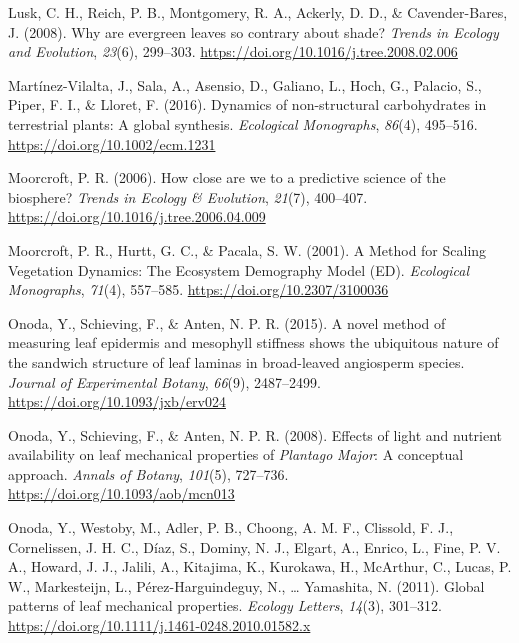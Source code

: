 \documentclass[
  12pt,
  letterpaper,
  DIV=11,
  numbers=noendperiod]{scrartcl}
\newlength{\cslhangindent}
\newlength{\cslentryspacingunit} %
\newenvironment{CSLReferences}[2] %
 {%
  \setlength{\parindent}{0pt}
  \ifodd #1
  \let\oldpar\par
  \def\par{\hangindent=\cslhangindent\oldpar}
  \fi
  \setlength{\parskip}{#2\cslentryspacingunit}
 }%
 {}
\begin{document}
\begin{CSLReferences}{1}{0}
\leavevmode{}%
Lusk, C. H., Reich, P. B., Montgomery, R. A., Ackerly, D. D., \&
Cavender-Bares, J. (2008). Why are evergreen leaves so contrary about
shade? \emph{Trends in Ecology and Evolution}, \emph{23}(6), 299--303.
\url{https://doi.org/10.1016/j.tree.2008.02.006}

\leavevmode{}%
Martínez-Vilalta, J., Sala, A., Asensio, D., Galiano, L., Hoch, G.,
Palacio, S., Piper, F. I., \& Lloret, F. (2016). Dynamics of
non-structural carbohydrates in terrestrial plants: A global synthesis.
\emph{Ecological Monographs}, \emph{86}(4), 495--516.
\url{https://doi.org/10.1002/ecm.1231}

\leavevmode{}%
Moorcroft, P. R. (2006). How close are we to a predictive science of the
biosphere? \emph{Trends in Ecology \& Evolution}, \emph{21}(7),
400--407. \url{https://doi.org/10.1016/j.tree.2006.04.009}

\leavevmode{}%
Moorcroft, P. R., Hurtt, G. C., \& Pacala, S. W. (2001). A {Method} for
{Scaling Vegetation Dynamics}: {The Ecosystem Demography Model} ({ED}).
\emph{Ecological Monographs}, \emph{71}(4), 557--585.
\url{https://doi.org/10.2307/3100036}

\leavevmode{}%
Onoda, Y., Schieving, F., \& Anten, N. P. R. (2015). A novel method of
measuring leaf epidermis and mesophyll stiffness shows the ubiquitous
nature of the sandwich structure of leaf laminas in broad-leaved
angiosperm species. \emph{Journal of Experimental Botany}, \emph{66}(9),
2487--2499. \url{https://doi.org/10.1093/jxb/erv024}

\leavevmode{}%
Onoda, Y., Schieving, F., \& Anten, N. P. R. (2008). Effects of light
and nutrient availability on leaf mechanical properties of
{\emph{Plantago}}{ \emph{Major}}: {A} conceptual approach. \emph{Annals
of Botany}, \emph{101}(5), 727--736.
\url{https://doi.org/10.1093/aob/mcn013}

\leavevmode{}%
Onoda, Y., Westoby, M., Adler, P. B., Choong, A. M. F., Clissold, F. J.,
Cornelissen, J. H. C., Díaz, S., Dominy, N. J., Elgart, A., Enrico, L.,
Fine, P. V. A., Howard, J. J., Jalili, A., Kitajima, K., Kurokawa, H.,
McArthur, C., Lucas, P. W., Markesteijn, L., Pérez-Harguindeguy, N.,
\ldots{} Yamashita, N. (2011). Global patterns of leaf mechanical
properties. \emph{Ecology Letters}, \emph{14}(3), 301--312.
\url{https://doi.org/10.1111/j.1461-0248.2010.01582.x}


\end{CSLReferences}
\end{document}

